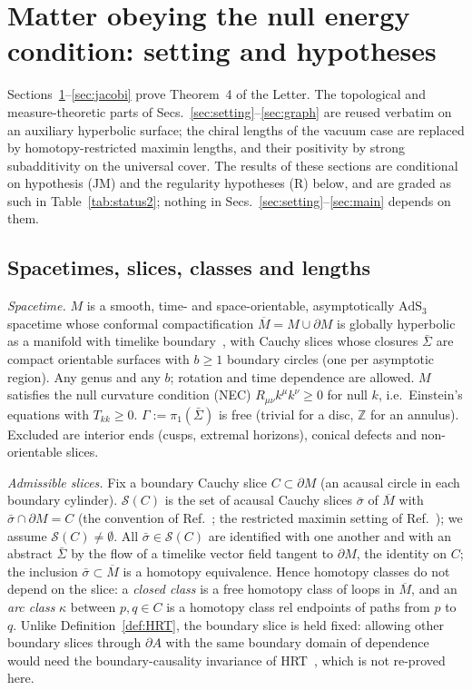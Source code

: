\documentclass[aps,prd,onecolumn,superscriptaddress,nofootinbib,amsmath,amssymb,11pt]{revtex4-2}
\theoremstyle{definition}
\newcommand{\AdS}{\mathrm{AdS}_3}
\newcommand{\Z}{\mathbb{Z}}
\newcommand{\Mbar}{\overline{M}}
\begin{document}
\section{Matter obeying the null energy condition: setting and hypotheses}\label{sec:matter}

Sections~\ref{sec:matter}--\ref{sec:jacobi} prove Theorem~4 of the Letter. The topological and measure-theoretic parts
of Secs.~\ref{sec:setting}--\ref{sec:graph} are reused verbatim on an auxiliary hyperbolic surface; the chiral lengths
of the vacuum case are replaced by homotopy-restricted maximin lengths, and their positivity by strong subadditivity on
the universal cover. The results of these sections are conditional on hypothesis (JM) and the regularity hypotheses (R) below,
and are graded as such in
Table~\ref{tab:status2}; nothing in Secs.~\ref{sec:setting}--\ref{sec:main} depends on them.

\subsection{Spacetimes, slices, classes and lengths}

\emph{Spacetime.} $M$ is a smooth, time- and space-orientable, asymptotically $\AdS$ spacetime whose conformal
compactification $\Mbar=M\cup\partial M$ is globally hyperbolic as a manifold with timelike
boundary~\cite{AkeFloresSanchez2021}, with Cauchy slices whose closures $\bar\Sigma$ are compact orientable surfaces with
$b\ge1$ boundary circles (one per asymptotic region). Any genus and any $b$; rotation and time dependence are allowed.
$M$ satisfies the null curvature condition (NEC) $R_{\mu\nu}k^\mu k^\nu\ge0$ for null $k$, i.e.\ Einstein's equations
with $T_{kk}\ge0$. $\Gamma:=\pi_1(\bar\Sigma)$ is free (trivial for a disc, $\Z$ for an annulus). Excluded are interior
ends (cusps, extremal horizons), conical defects and non-orientable slices.

\emph{Admissible slices.} Fix a boundary Cauchy slice $C\subset\partial M$ (an acausal circle in each boundary cylinder).
$\mathcal S(C)$ is the set of acausal Cauchy slices $\bar\sigma$ of $\Mbar$ with $\bar\sigma\cap\partial M=C$ (the
convention of Ref.~\cite{HHLR2014}; the restricted maximin setting of Ref.~\cite{MarolfWallWang2019}); we assume
$\mathcal S(C)\ne\emptyset$. All $\bar\sigma\in\mathcal S(C)$ are identified with one another and with an abstract
$\bar\Sigma$ by the flow of a timelike vector field tangent to $\partial M$, the identity on $C$; the inclusion
$\bar\sigma\subset\Mbar$ is a homotopy equivalence. Hence homotopy classes do not depend on the slice: a \emph{closed
class} is a free homotopy class of loops in $\Mbar$, and an \emph{arc class} $\kappa$ between $p,q\in C$ is a homotopy
class rel endpoints of paths from $p$ to $q$. Unlike Definition~\ref{def:HRT}, the boundary slice is held fixed:
allowing other boundary slices through $\partial A$ with the same boundary domain of dependence would need the
boundary-causality invariance of HRT~\cite{HHLR2014}, which is not re-proved here.
\end{document}
